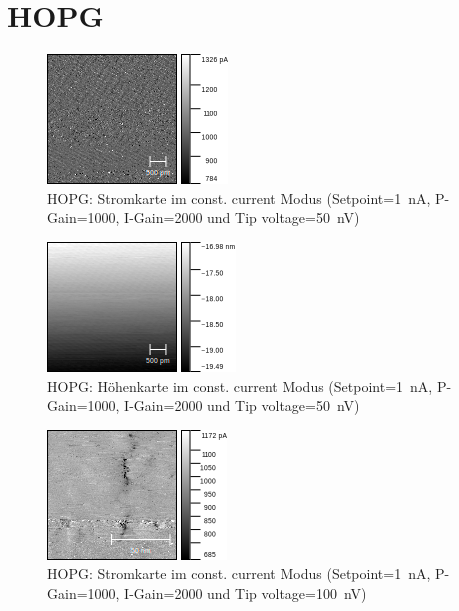 \documentclass[sn-mathphys-num,iicol]{sn-jnl}
\theoremstyle{thmstyleone}
\theoremstyle{thmstyletwo}
\theoremstyle{thmstylethree}
\begin{document}
\section{HOPG}
\begin{figure}[h]
        \centering
        \includegraphics[width=.5\textwidth]{../data/Graphit_4nm_1V_current.png}
        \caption{HOPG: Stromkarte im const. current Modus (Setpoint=\SI{1}{\nano A}, P-Gain=\SI{1000}{}, I-Gain=\SI{2000}{} und Tip voltage=\SI{50}{\nano V})} \label{fig:gr4nm50nVc}
\end{figure}
\begin{figure}[h]
        \centering
        \includegraphics[width=.5\textwidth]{../data/Graphit_4nm_1V_z.png}
        \caption{HOPG: Höhenkarte im const. current Modus (Setpoint=\SI{1}{\nano A}, P-Gain=\SI{1000}{}, I-Gain=\SI{2000}{} und Tip voltage=\SI{50}{\nano V})} \label{fig:gr4nm50nVz}
\end{figure}
\begin{figure}[h]
        \centering
        \includegraphics[width=.5\textwidth]{../data/Graphit2_current.png}
        \caption{HOPG: Stromkarte im const. current Modus (Setpoint=\SI{1}{\nano A}, P-Gain=\SI{1000}{}, I-Gain=\SI{2000}{} und Tip voltage=\SI{100}{\nano V})} \label{fig:gr100nm100nVc}
\end{figure}
\end{document}
